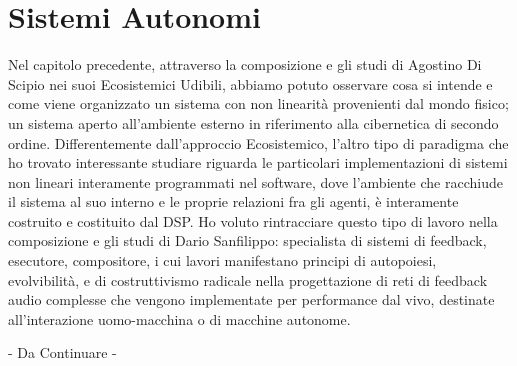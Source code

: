 \section{Sistemi Autonomi}
\label{sec:Sistemi Autonomi}

Nel capitolo precedente, attraverso la composizione e gli studi di Agostino Di Scipio 
nei suoi Ecosistemici Udibili, abbiamo potuto osservare
cosa si intende e come viene organizzato un sistema con non linearità provenienti dal 
mondo fisico; un sistema aperto all'ambiente esterno in riferimento 
alla cibernetica di secondo ordine.
Differentemente dall'approccio Ecosistemico, l'altro tipo di paradigma che ho trovato 
interessante studiare riguarda le particolari implementazioni di sistemi non lineari 
interamente programmati nel software, dove l'ambiente che racchiude il sistema al suo
interno e le proprie relazioni fra gli agenti, è interamente 
costruito e costituito dal DSP.
Ho voluto rintracciare questo tipo di lavoro nella composizione e gli studi
di Dario Sanfilippo: specialista di sistemi di feedback, esecutore, compositore,
i cui lavori manifestano principi di autopoiesi, evolvibilità, e di costruttivismo radicale 
nella progettazione di reti di feedback audio complesse 
che vengono implementate per performance dal vivo, destinate all'interazione 
uomo-macchina o di macchine autonome.

\begin{center} \vspace{0.5cm} \Huge - Da Continuare - \normalsize \vspace{0.5cm} \end{center}